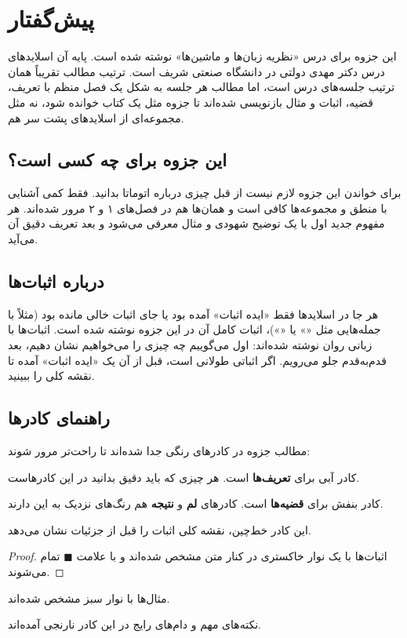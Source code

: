 \chapter*{پیش‌گفتار}

این جزوه برای درس «نظریه زبان‌ها و ماشین‌ها» نوشته شده است. پایه آن اسلایدهای درس دکتر مهدی دولتی در دانشگاه صنعتی شریف است. ترتیب مطالب تقریباً همان ترتیب جلسه‌های درس است، اما مطالب هر جلسه به شکل یک فصل منظم با تعریف، قضیه، اثبات و مثال بازنویسی شده‌اند تا جزوه مثل یک کتاب خوانده شود، نه مثل مجموعه‌ای از اسلایدهای پشت سر هم.

\section*{این جزوه برای چه کسی است؟}
برای خواندن این جزوه لازم نیست از قبل چیزی درباره اتوماتا بدانید. فقط کمی آشنایی با منطق و مجموعه‌ها کافی است و همان‌ها هم در فصل‌های ۱ و ۲ مرور شده‌اند. هر مفهوم جدید اول با یک توضیح شهودی و مثال معرفی می‌شود و بعد تعریف دقیق آن می‌آید.

\section*{درباره اثبات‌ها}
هر جا در اسلایدها فقط «ایده اثبات» آمده بود یا جای اثبات خالی مانده بود (مثلاً با جمله‌هایی مثل «» یا «»)، اثبات کامل آن در این جزوه نوشته شده است. اثبات‌ها با زبانی روان نوشته شده‌اند: اول می‌گوییم چه چیزی را می‌خواهیم نشان دهیم، بعد قدم‌به‌قدم جلو می‌رویم. اگر اثباتی طولانی است، قبل از آن یک «ایده اثبات» آمده تا نقشه کلی را ببینید.

\section*{راهنمای کادرها}
مطالب جزوه در کادرهای رنگی جدا شده‌اند تا راحت‌تر مرور شوند:

\begin{definition}[نمونه]
کادر آبی برای \textbf{تعریف‌ها} است. هر چیزی که باید دقیق بدانید در این کادرهاست.
\end{definition}
\begin{theorem}[نمونه]
کادر بنفش برای \textbf{قضیه‌ها} است. کادرهای \textbf{لم} و \textbf{نتیجه} هم رنگ‌های نزدیک به این دارند.
\end{theorem}
\begin{proofidea}
این کادر خط‌چین، نقشه کلی اثبات را قبل از جزئیات نشان می‌دهد.
\end{proofidea}
\begin{proof}
اثبات‌ها با یک نوار خاکستری در کنار متن مشخص شده‌اند و با علامت $\blacksquare$ تمام می‌شوند.
\end{proof}
\begin{example}[نمونه]
مثال‌ها با نوار سبز مشخص شده‌اند.
\end{example}
\begin{note}
نکته‌های مهم و دام‌های رایج در این کادر نارنجی آمده‌اند.
\end{note}

